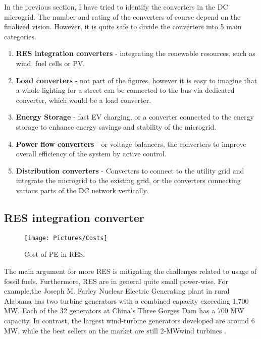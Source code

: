 \documentclass[]{scrartcl}
\begin{document}
In the previous section, I have tried to identify the converters in the DC microgrid. The number and rating of the converters of course depend on the finalized vision. However, it is quite safe to divide the converters into 5 main categories.
\begin{enumerate}
	\item \textbf{RES integration converters }- integrating the renewable resources, such as wind, fuel cells or PV. 
	\item \textbf{Load converters} - not part of the figures, however it is easy to imagine that a whole lighting for a street can be connected to the bus via dedicated converter, which would be a load converter. 
	\item \textbf{Energy Storage } - fast EV charging, or a converter connected to the energy storage to enhance energy savings and stability of the microgrid.
	\item \textbf{Power flow converters} - or voltage balancers, the converters to improve overall efficiency of the system by active control.
	\item \textbf{Distribution converters} - Converters to connect to the utility grid and integrate the microgrid to the existing grid, or the converters connecting various parts of the DC network vertically.
	
	\end{enumerate}
	\newpage
	\subsection{RES integration converter}
	

\begin{wrapfigure}{r}{0.5\textwidth}
	\vspace{-20pt}
	\centering
	\texttt{[image: Pictures/Costs]}
	\vspace{-5pt}
	\caption{Cost of PE in RES.\cite{Chakraborty2009}}
	\vspace{-10pt}
	\label{fig:Costs}
\end{wrapfigure}
The main argument for more RES is mitigating the challenges related to usage of fossil fuels. Furthermore, RES are in general quite small power-wise. For example,the Joseph M. Farley Nuclear Electric Generating plant in rural Alabama has two turbine generators with a combined capacity exceeding 1,700 MW. Each of the 32 generators at China’s Three Gorges Dam has a 700 MW capacity. In contrast, the largest wind-turbine generators developed are around 6 MW, while the best sellers on the market are still 2-MWwind turbines \cite{Liserre2010}. 
\end{document}
